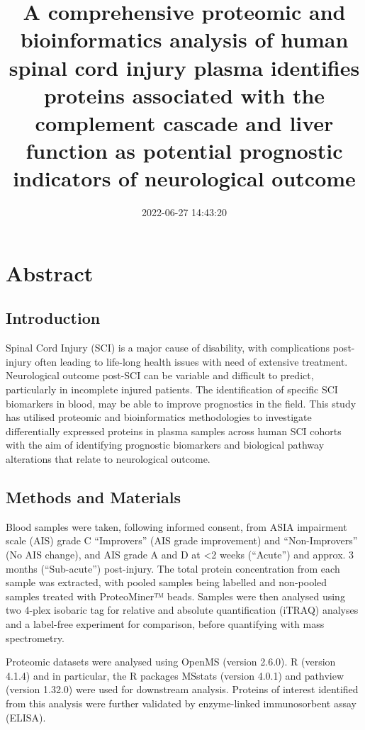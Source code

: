 \documentclass[9pt,lineno]{elife}
\title{A comprehensive proteomic and bioinformatics analysis of human spinal cord injury plasma identifies proteins associated with the complement cascade and liver function as potential prognostic indicators of neurological outcome}
\author{}
\date{2022-06-27 14:43:20}
\begin{document}
\maketitle

\hypertarget{abstract}{%
\section{Abstract}\label{abstract}}

\hypertarget{introduction}{%
\subsection{Introduction}\label{introduction}}

Spinal Cord Injury (SCI) is a major cause of disability, with complications post-injury often leading to life-long health issues with need of extensive treatment.
Neurological outcome post-SCI can be variable and difficult to predict, particularly in incomplete injured patients.
The identification of specific SCI biomarkers in blood, may be able to improve prognostics in the field.
This study has utilised proteomic and bioinformatics methodologies to investigate differentially expressed proteins in plasma samples across human SCI cohorts with the aim of identifying prognostic biomarkers and biological pathway alterations that relate to neurological outcome.

\hypertarget{methods-and-materials}{%
\subsection{Methods and Materials}\label{methods-and-materials}}

Blood samples were taken, following informed consent, from ASIA impairment scale (AIS) grade C ``Improvers'' (AIS grade improvement) and ``Non-Improvers'' (No AIS change), and AIS grade A and D at \textless2 weeks (``Acute'') and approx.
3 months (``Sub-acute'') post-injury.
The total protein concentration from each sample was extracted, with pooled samples being labelled and non-pooled samples treated with ProteoMiner™ beads.
Samples were then analysed using two 4-plex isobaric tag for relative and absolute quantification (iTRAQ) analyses and a label-free experiment for comparison, before quantifying with mass spectrometry.

Proteomic datasets were analysed using OpenMS (version 2.6.0).
R (version 4.1.4) and in particular, the R packages MSstats (version 4.0.1) and pathview (version 1.32.0) were used for downstream analysis.
Proteins of interest identified from this analysis were further validated by enzyme-linked immunosorbent assay (ELISA).
\end{document}
